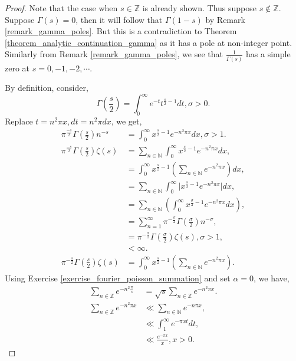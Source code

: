 \documentclass{article}
\newcommand{\N}[0]{\mathbb{N}}
\newcommand{\Z}[0]{\mathbb{Z}}
\begin{document}
\begin{proof}
  Note that the case when $s\in\Z$ is already shown. Thus suppose $s\not\in\Z$. Suppose $\Gamma(s)=0$, then it will follow that $\Gamma(1-s)$ by Remark \ref{remark_gamma_poles}. But this is a contradiction to Theorem \ref{theorem_analytic_continuation_gamma} as it has a pole at non-integer point.
  Similarly from Remark \ref{remark_gamma_poles}, we see that ${\frac 1 {\Gamma(s)}}$ has a simple zero at $s=0,-1,-2,\cdots$.
  \par By definition, consider,
  \begin{equation*}
    \Gamma\left({\frac s 2}\right) = \int_0^\infty e^{-t}t^{{\frac s 2}-1}dt, \sigma>0.
  \end{equation*}
  Replace $t=n^2\pi x,dt = n^2\pi dx$, we get,
  \begin{align*}
    \pi^{{\frac {-s} 2}}\Gamma\left({\frac s 2}\right)n^{-s} & = \int_0^\infty x^{{\frac s 2}-1}e^{-n^2\pi x}dx, \sigma>1.\\
    \pi^{{\frac {-s} 2}}\Gamma\left({\frac s 2}\right)\zeta(s) & = \sum_{n\in\N}\int_0^\infty x^{{\frac s 2}-1}e^{-n^2\pi x}dx,\\
    & = \int_0^\infty x^{{\frac s 2}-1}\left(\sum_{n\in\N}e^{-n^2\pi x}\right)dx,\\
    & = \sum_{n\in\N}\int_0^\infty\vert x^{{\frac s 2}-1}e^{-n^2\pi x}\vert dx,\\
    & = \sum_{n\in\N}\left(\int_0^\infty x^{{\frac \sigma 2}-1}e^{-n^2\pi x}dx\right),\\
    & = \sum_{n=1}^\infty \pi^{-{\frac {\sigma} 2}}\Gamma\left({\frac \sigma 2}\right)n^{-\sigma},\\
    & = \pi^{-{\frac \sigma 2}}\Gamma\left({\frac \sigma 2}\right)\zeta(s),\sigma>1,\\
    & < \infty.\\
    \pi^{-{\frac s 2}}\Gamma\left({\frac s 2}\right)\zeta(s) & = \int_0^\infty x^{{\frac s 2}-1}\left(\sum_{n\in\N}e^{-n^2\pi x}\right).
  \end{align*}
  Using Exercise \ref{exercise_fourier_poisson_summation} and set $\alpha=0$, we have,
  \begin{align*}
    \sum_{n\in\Z}e^{-n^2{\frac \pi s}} & = \sqrt{s}\sum_{n\in\Z}e^{-n^2 \pi x}.\\
    \sum_{n\in\Z}e^{-n^2\pi x}& \ll  \sum_{n\in\N}e^{-n\pi x},\\
    & \ll  \int_1^\infty e^{-\pi xt }dt,\\
    & \ll  {\frac {e^{-\pi x}} {x}}, x>0.
  \end{align*}

\end{proof}
\end{document}
